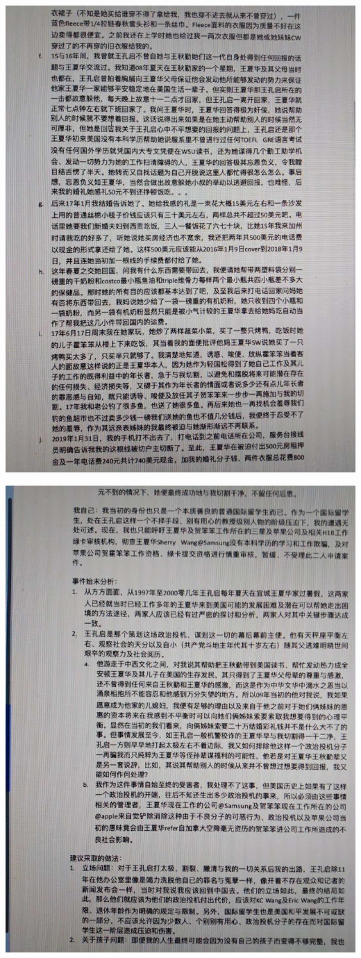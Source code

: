 \documentclass[9pt, b5paper]{article}
\begin{document}
\begin{center}
\includegraphics[width=.9\linewidth]{./pic/3.jpg}
\end{center}

\begin{center}
\includegraphics[width=.9\linewidth]{./pic/4.jpg}
\end{center}
\end{document}
